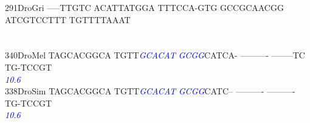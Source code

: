 \documentclass[11pt,twoside,reqno,a4paper]{article}
\begin{document}
{291\hspace*{1\charwidth}DroGri	-----TTGTC	ACATTATGGA	TTTCCA-GTG	GCCGCAACGG	ATCGTCCTTT	TGTTTTAAAT	\\
\hspace*{4\charwidth}\hspace*{7\charwidth}\hspace*{1\charwidth}\hspace*{1\charwidth}\hspace*{1\charwidth}\hspace*{1\charwidth}\hspace*{1\charwidth}\hspace*{1\charwidth}\\
\\
340\hspace*{1\charwidth}DroMel	TAGCACGGCA	TGTT\textit{\textcolor{Blue}{G}}\textit{\textcolor{Blue}{C}}\textit{\textcolor{Blue}{A}}\textit{\textcolor{Blue}{C}}\textit{\textcolor{Blue}{A}}\textit{\textcolor{Blue}{T}}	\textit{\textcolor{Blue}{G}}\textit{\textcolor{Blue}{C}}\textit{\textcolor{Blue}{G}}\textit{\textcolor{Blue}{G}}CATCA-	----------	--------TC	TG-TCCGT\\
\hspace*{4\charwidth}\hspace*{7\charwidth}\hspace*{1\charwidth}\hspace*{14\charwidth}\textit{\textcolor{Blue}{10.6}}\hspace*{1\charwidth}\hspace*{1\charwidth}\hspace*{1\charwidth}\hspace*{1\charwidth}\\
338\hspace*{1\charwidth}DroSim	TAGCACGGCA	TGTT\textit{\textcolor{Blue}{G}}\textit{\textcolor{Blue}{C}}\textit{\textcolor{Blue}{A}}\textit{\textcolor{Blue}{C}}\textit{\textcolor{Blue}{A}}\textit{\textcolor{Blue}{T}}	\textit{\textcolor{Blue}{G}}\textit{\textcolor{Blue}{C}}\textit{\textcolor{Blue}{G}}\textit{\textcolor{Blue}{G}}CATC--	----------	----------	TG-TCCGT\\
\hspace*{4\charwidth}\hspace*{7\charwidth}\hspace*{1\charwidth}\hspace*{14\charwidth}\textit{\textcolor{Blue}{10.6}}\hspace*{1\charwidth}\hspace*{1\charwidth}\hspace*{1\charwidth}\hspace*{1\charwidth}\\
}
\end{document}
